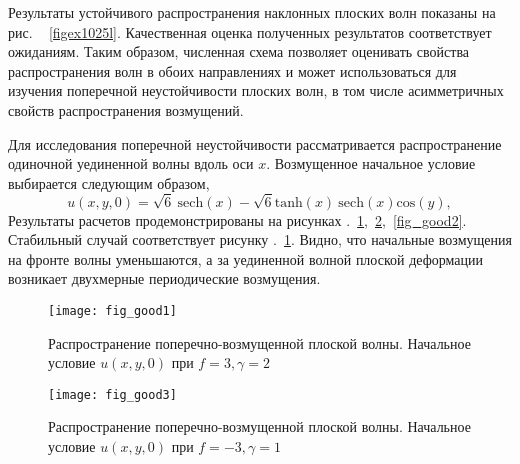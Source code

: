 Результаты устойчивого распространения наклонных плоских волн показаны на рис. ~ \ref{figex1025l}. Качественная оценка полученных результатов соответствует ожиданиям. Таким образом, численная схема позволяет оценивать свойства распространения волн в обоих направлениях и может использоваться для изучения поперечной неустойчивости плоских волн, в том числе асимметричных свойств распространения возмущений.

Для исследования поперечной неустойчивости рассматривается распространение одиночной уединенной волны вдоль оси $ x $. Возмущенное начальное условие выбирается следующим образом,
\begin{equation}
	u(x,y,0) = \sqrt{6} ~{\text{sech}}(x)-\sqrt{6}{\text{tanh}} (x) ~{\text{sech}}(x) {\text{cos}} (y),
\end{equation}
Результаты расчетов продемонстрированы на рисунках .~\ref{fig_good1},~\ref{fig_good3},~\ref{fig_good2}. 
Стабильный случай соответствует рисунку .~\ref{fig_good1}.
Видно, что начальные возмущения на фронте волны уменьшаются, а за уединенной волной плоской деформации возникает двухмерные периодические возмущения.

\begin{figure}
	\centering
	\texttt{[image: fig\_good1]}
	\caption{Распространение поперечно-возмущенной плоской волны. Начальное условие $u(x,y,0)$ при $f = 3, \gamma = 2$} \label{fig_good1}
\end{figure}

\begin{figure}
	\centering
	\texttt{[image: fig\_good3]}
	\caption{Распространение поперечно-возмущенной плоской волны. Начальное условие $u(x,y,0)$ при $f = -3, \gamma = 1$} \label{fig_good3}	
\end{figure}

